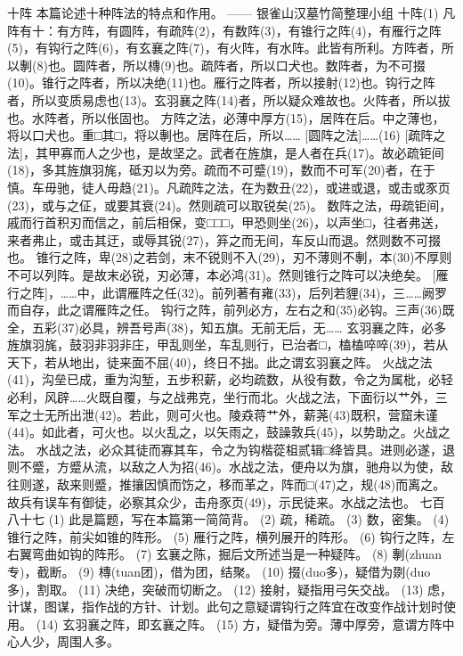 \documentclass[12pt,UTF8]{ctexbook}
\begin{document}
十阵
本篇论述十种阵法的特点和作用。
—— 银雀山汉墓竹简整理小组
十阵(1)
凡阵有十：有方阵，有圆阵，有疏阵(2)，有数阵(3)，有锥行之阵(4)，有雁行之阵(5)，有钩行之阵(6)，有玄襄之阵(7)，有火阵，有水阵。此皆有所利。方阵者，所以剸(8)也。圆阵者，所以槫(9)也。疏阵者，所以{口犬}也。数阵者，为不可掇(10)。锥行之阵者，所以决绝(11)也。雁行之阵者，所以接射(12)也。钩行之阵者，所以变质易虑也(13)。玄{羽襄}之阵(14)者，所以疑众难故也。火阵者，所以拔也。水阵者，所以伥固也。
方阵之法，必薄中厚方(15)，居阵在后。中之薄也，将以{口犬}也。重□其□，将以剸也。居阵在后，所以……
[圆阵之法]……(16)
[疏阵之法]，其甲寡而人之少也，是故坚之。武者在旌旗，是人者在兵(17)。故必疏钜间(18)，多其旌旗羽旄，砥刃以为旁。疏而不可蹙(19)，数而不可军(20)者，在于慎。车毋驰，徒人毋趋(21)。凡疏阵之法，在为数丑(22)，或进或退，或击或{豕页}(23)，或与之佂，或要其衰(24)。然则疏可以取锐矣(25)。
数阵之法，毋疏钜间，戚而行首积刃而信之，前后相保，变□□□，甲恐则坐(26)，以声坐□，往者弗送，来者弗止，或击其迂，或辱其锐(27)，笲之而无间，{车反}山而退。然则数不可掇也。
锥行之阵，卑(28)之若剑，末不锐则不入(29)，刃不薄则不剸，本(30)不厚则不可以列阵。是故末必锐，刃必薄，本必鸿(31)。然则锥行之阵可以决绝矣。
[雁行之阵]，……中，此谓雁阵之任(32)。前列著{有雍}(33)，后列若貍(34)，三……阙罗而自存，此之谓雁阵之任。
钩行之阵，前列必方，左右之和(35)必钩。三声(36)既全，五彩(37)必具，辨吾号声(38)，知五旗。无前无后，无……
玄{羽襄}之阵，必多旌旗羽旄，鼓{羽非}{羽非}庄，甲乱则坐，车乱则行，已治者□，榼榼啐啐(39)，若从天下，若从地出，徒来面不屈(40)，终日不拙。此之谓玄{羽襄}之阵。
火战之法(41)，沟垒已成，重为沟堑，五步积薪，必均疏数，从役有数，令之为属枇，必轻必利，风辟……火既自覆，与之战弗克，坐行而北。火战之法，下面衍以{艹外}，三军之士无所出泄(42)。若此，则可火也。陵猋蒋{艹外}，薪荛(43)既积，营窟未谨(44)。如此者，可火也。以火乱之，以矢雨之，鼓譟敦兵(45)，以势助之。火战之法。
水战之法，必众其徒而寡其车，令之为钩楷蓯柤贰辑□绛皆具。进则必遂，退则不蹙，方蹙从流，以敌之人为招(46)。水战之法，便舟以为旗，驰舟以为使，敌往则遂，敌来则蹙，推攘因慎而饬之，移而革之，阵而□(47)之，规(48)而离之。故兵有误车有御徒，必察其众少，击舟{豕页}(49)，示民徒来。水战之法也。
七百八十七
(1) 此是篇题，写在本篇第一简简背。
(2) 疏，稀疏。
(3) 数，密集。
(4) 锥行之阵，前尖如锥的阵形。
(5) 雁行之阵，横列展开的阵形。
(6) 钩行之阵，左右翼弯曲如钩的阵形。
(7) 玄襄之陈，掘后文所述当是一种疑阵。
(8) 剸(zhuan专)，截断。
(9) 槫(tuan团)，借为团，结聚。
(10) 掇(duo多)，疑借为剟(duo多)，割取。
(11) 决绝，突破而切断之。
(12) 接射，疑指用弓矢交战。
(13) 虑，计谋，图谋，指作战的方针、计划。此句之意疑谓钩行之阵宜在改变作战计划时使用。
(14) 玄{羽襄}之阵，即玄襄之阵。
(15) 方，疑借为旁。薄中厚旁，意谓方阵中心人少，周围人多。
\end{document}
